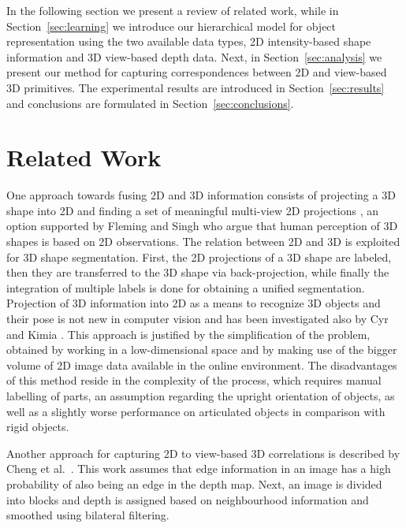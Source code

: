 \documentclass[runningheads]{llncs}
\begin{document}
In the following section we present a review of related work, while in Section~\ref{sec:learning} we introduce our hierarchical model for object representation using the two available data types, 2D intensity-based shape information and 3D view-based depth data. Next, in Section~\ref{sec:analysis} we present our method for capturing correspondences between 2D and view-based 3D primitives. The experimental results are introduced in Section~\ref{sec:results} and conclusions are formulated in Section~\ref{sec:conclusions}.

\section{Related Work}
\label{sec:related_work}  

One approach towards fusing 2D and 3D information consists of projecting a 3D shape into 2D and finding a set of meaningful multi-view 2D projections \cite{WangGWC0C13}, an option supported by Fleming and Singh \cite{Fleming2009} who argue that human perception of 3D shapes is based on 2D observations. The relation between 2D and 3D is exploited for 3D shape segmentation. First, the 2D projections of a 3D shape are labeled, then they are transferred to the 3D shape via back-projection, while finally the integration of multiple labels is done for obtaining a unified segmentation. Projection of 3D information into 2D as a means to recognize 3D objects and their pose is not new in computer vision and has been investigated also by Cyr and Kimia \cite{Cyr2001}. This approach is justified by the simplification of the problem, obtained by working in a low-dimensional space and by making use of the bigger volume of 2D image data available in the online environment. The disadvantages of this method reside in the complexity of the process, which requires manual labelling of parts, an assumption regarding the upright orientation of objects, as well as a slightly worse performance on articulated objects in comparison with rigid objects.

Another approach for capturing 2D to view-based 3D correlations is described by Cheng et al.~\cite{Cheng2010}. This work assumes that edge information in an image has a high probability of also being an edge in the depth map. Next, an image is divided into blocks and depth is assigned based on neighbourhood information and smoothed using bilateral filtering.
\end{document}
